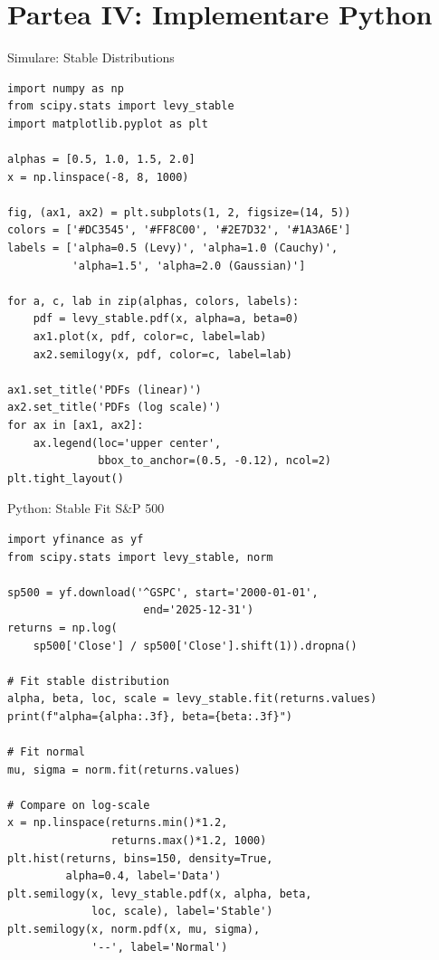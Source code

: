 \documentclass[9pt, aspectratio=169, t]{beamer}
\theoremstyle{definition}
\begin{document}
\section{Partea IV: Implementare Python}

\begin{frame}[fragile]{Simulare: Stable Distributions}
\begin{lstlisting}
import numpy as np
from scipy.stats import levy_stable
import matplotlib.pyplot as plt

alphas = [0.5, 1.0, 1.5, 2.0]
x = np.linspace(-8, 8, 1000)

fig, (ax1, ax2) = plt.subplots(1, 2, figsize=(14, 5))
colors = ['#DC3545', '#FF8C00', '#2E7D32', '#1A3A6E']
labels = ['alpha=0.5 (Levy)', 'alpha=1.0 (Cauchy)',
          'alpha=1.5', 'alpha=2.0 (Gaussian)']

for a, c, lab in zip(alphas, colors, labels):
    pdf = levy_stable.pdf(x, alpha=a, beta=0)
    ax1.plot(x, pdf, color=c, label=lab)
    ax2.semilogy(x, pdf, color=c, label=lab)

ax1.set_title('PDFs (linear)')
ax2.set_title('PDFs (log scale)')
for ax in [ax1, ax2]:
    ax.legend(loc='upper center',
              bbox_to_anchor=(0.5, -0.12), ncol=2)
plt.tight_layout()
\end{lstlisting}
\end{frame}

\begin{frame}[fragile]{Python: Stable Fit S\&P 500}
\begin{lstlisting}
import yfinance as yf
from scipy.stats import levy_stable, norm

sp500 = yf.download('^GSPC', start='2000-01-01',
                     end='2025-12-31')
returns = np.log(
    sp500['Close'] / sp500['Close'].shift(1)).dropna()

# Fit stable distribution
alpha, beta, loc, scale = levy_stable.fit(returns.values)
print(f"alpha={alpha:.3f}, beta={beta:.3f}")

# Fit normal
mu, sigma = norm.fit(returns.values)

# Compare on log-scale
x = np.linspace(returns.min()*1.2,
                returns.max()*1.2, 1000)
plt.hist(returns, bins=150, density=True,
         alpha=0.4, label='Data')
plt.semilogy(x, levy_stable.pdf(x, alpha, beta,
             loc, scale), label='Stable')
plt.semilogy(x, norm.pdf(x, mu, sigma),
             '--', label='Normal')
\end{lstlisting}
\end{frame}
\end{document}
